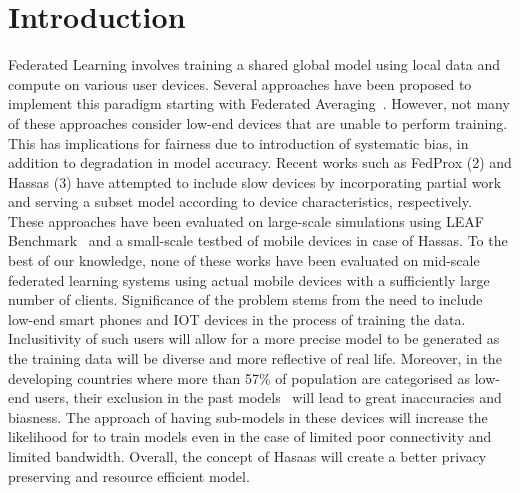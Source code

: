 \section{Introduction}
    Federated Learning involves training a shared global model using local data and compute on various user devices.
    Several approaches have been proposed to implement this paradigm starting with Federated Averaging~\cite{DBLP:journals/corr/McMahanMRA16}.
    However, not many of these approaches consider low-end devices that are unable to perform training. 
    This has implications for fairness due to introduction of systematic bias, in addition to degradation in model accuracy.
    Recent works such as FedProx (2) and Hassas (3) have attempted to include slow devices by incorporating partial work and serving a subset model according to device characteristics, respectively. 
    These approaches have been evaluated on large-scale simulations using LEAF Benchmark~\cite{DBLP:journals/corr/abs-1812-01097} and a small-scale testbed of mobile devices in case of Hassas.
    To the best of our knowledge, none of these works have been evaluated on mid-scale federated learning systems using actual mobile devices with a sufficiently large number of clients.
    \newline
    Significance of the problem stems from the need to include low-end smart phones and IOT devices in the process of training the data. Inclusitivity of such users will allow for a  more precise model to be generated as the training data will be diverse and more  reflective of real life. Moreover, in the developing countries where more than 57\% of population are categorised as low-end users, their exclusion in the past models~\cite{10.1145/3446382.3448652} will lead to great inaccuracies and biasness. The approach of having sub-models in these devices will increase the likelihood for to train models even in the  case of limited poor connectivity and limited bandwidth. Overall, the concept of Hasaas will create a better privacy preserving and resource efficient model.